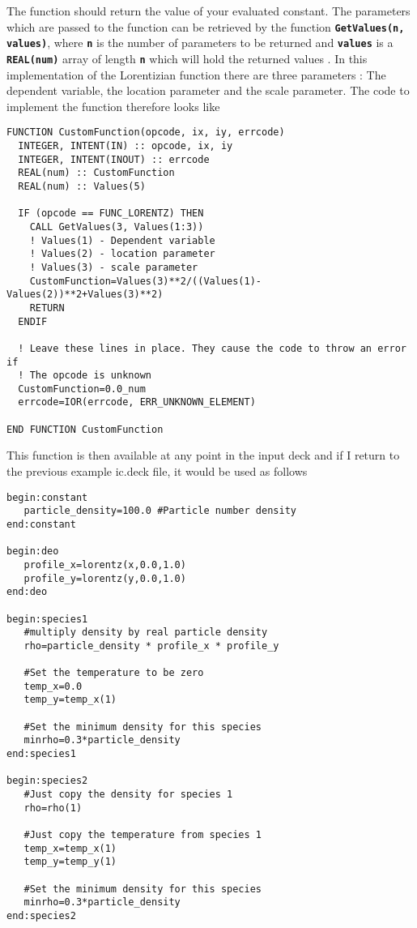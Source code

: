 \documentclass[12pt,a4paper]{article}
\newcommand{\simpleboxverbatim}{\begin{Verbatim}[obeytabs=true,frame=single,
  framerule=0.5mm,rulecolor=\color{warwickmid},formatcom=\color{black}]}
\newcommand{\inlinecode}[1]{{\color{warwickred} \bf\texttt{#1}}}
\begin{document}
The function should return the value of your evaluated constant. The
parameters which are passed to the function can be retrieved by the function
\inlinecode {GetValues(n, values)}, where \inlinecode {n} is the number of
parameters to be returned and \inlinecode{values} is a \inlinecode{REAL(num)}
array of length \inlinecode{n} which will hold the returned values .  In this
implementation of the Lorentizian function there are three parameters : The
dependent variable, the location parameter and the scale parameter. The code
to implement the function therefore looks like

\simpleboxverbatim
FUNCTION CustomFunction(opcode, ix, iy, errcode)
  INTEGER, INTENT(IN) :: opcode, ix, iy
  INTEGER, INTENT(INOUT) :: errcode
  REAL(num) :: CustomFunction
  REAL(num) :: Values(5)

  IF (opcode == FUNC_LORENTZ) THEN
    CALL GetValues(3, Values(1:3))
    ! Values(1) - Dependent variable
    ! Values(2) - location parameter
    ! Values(3) - scale parameter
    CustomFunction=Values(3)**2/((Values(1)-Values(2))**2+Values(3)**2)
    RETURN
  ENDIF

  ! Leave these lines in place. They cause the code to throw an error if
  ! The opcode is unknown
  CustomFunction=0.0_num
  errcode=IOR(errcode, ERR_UNKNOWN_ELEMENT)

END FUNCTION CustomFunction
\end{Verbatim}

This function is then available at any point in the input deck and if I return
to the previous example ic.deck file, it would be used as follows

\simpleboxverbatim
begin:constant
   particle_density=100.0 #Particle number density
end:constant

begin:deo
   profile_x=lorentz(x,0.0,1.0)
   profile_y=lorentz(y,0.0,1.0)
end:deo

begin:species1
   #multiply density by real particle density
   rho=particle_density * profile_x * profile_y

   #Set the temperature to be zero
   temp_x=0.0
   temp_y=temp_x(1)

   #Set the minimum density for this species
   minrho=0.3*particle_density
end:species1

begin:species2
   #Just copy the density for species 1
   rho=rho(1)

   #Just copy the temperature from species 1
   temp_x=temp_x(1)
   temp_y=temp_y(1)

   #Set the minimum density for this species
   minrho=0.3*particle_density
end:species2
\end{Verbatim}
\end{document}
